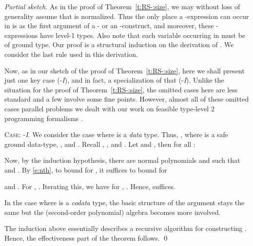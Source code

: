 \documentclass[envcountsame]{llncs}
\begin{document}
\begin{proof}[Partial sketch]
As in the proof of Theorem~\ref{t:RS-:size}, we may without loss of
generality assume that  is normalized.  Thus 
the only place a -expression can occur in  is 
as the first argument of a - or an -construct, 
and moreover, these -expressions have level-1 types.
Also note that each variable occurring in  must be of ground type. 
Our proof is a structural induction on the derivation of 
.  
We consider the last rule used in this derivation.


Now, as in our sketch of the proof of Theorem~\ref{t:RS-:size}, 
here we shall present just one key case (-\emph{I}), 
and in fact, a specialization of that (-\emph{I}).
Unlike the situation for the proof of Theorem~\ref{t:RS-:size},
the omitted cases here are less standard and a few 
involve some fine points.  However, almost all of these omitted 
cases parallel problems we dealt with our work on feasible
type-level 2 programming formalisms 
\cite{DR:ATS:LMCS,DannerRoyer:2algs}.




\textsc{Case:} -\emph{I}.
We consider the case where  is a \emph{data} type.
Thus, , where 
 is a safe ground data-type,
, and .  
Recall 
,
, and
.
Let  and , then
for all :

Now, by the induction hypothesis, there are normal polynomials
 and  such that
 and
.  
By \eqref{e:nth}, to bound  for , 
it suffices to bound  for 

and .
For , 
.
Iterating this, we have for , 
.
Hence,  suffices.


In the case where  is a \emph{codata} type, the basic 
structure of the argument stays the same but the (second-order
polynomial) algebra becomes more involved. 





The induction above essentially describes a recursive algorithm 
for constructing .  Hence, the effectiveness part of the 
theorem follows. 
\qed
\end{proof}
\end{document}
